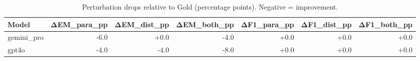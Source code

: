 \begin{table}[t]\centering
\caption{Perturbation drops relative to Gold (percentage points). Negative = improvement.}
\label{tab:drops}
\begin{tabular}{lrrrrrr}
\toprule
Model & ΔEM_para_pp & ΔEM_dist_pp & ΔEM_both_pp & ΔF1_para_pp & ΔF1_dist_pp & ΔF1_both_pp \\
\midrule
gemini_pro & -6.0 & +0.0 & -4.0 & +0.0 & +0.0 & +0.0 \\
gpt4o & -4.0 & -4.0 & -8.0 & +0.0 & +0.0 & +0.0 \\
\bottomrule
\end{tabular}
\end{table}
